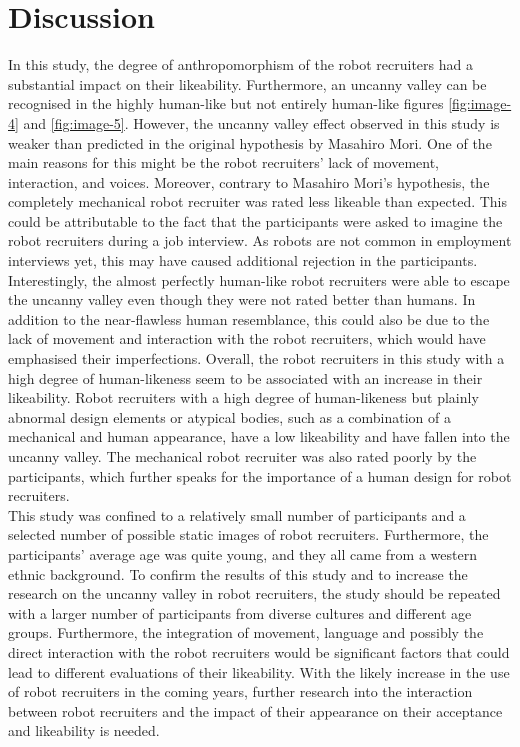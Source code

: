 \section{Discussion}
In this study, the degree of anthropomorphism of the robot recruiters had a substantial impact on their likeability. Furthermore, an uncanny valley can be recognised in the highly human-like but not entirely human-like figures \ref{fig:image-4} and \ref{fig:image-5}. However, the uncanny valley effect observed in this study is weaker than predicted in the original hypothesis by Masahiro Mori. One of the main reasons for this might be the robot recruiters' lack of movement, interaction, and voices. Moreover, contrary to Masahiro Mori's hypothesis, the completely mechanical robot recruiter was rated less likeable than expected. This could be attributable to the fact that the participants were asked to imagine the robot recruiters during a job interview. As robots are not common in employment interviews yet, this may have caused additional rejection in the participants.
Interestingly, the almost perfectly human-like robot recruiters were able to escape the uncanny valley even though they were not rated better than humans. In addition to the near-flawless human resemblance, this could also be due to the lack of movement and interaction with the robot recruiters, which would have emphasised their imperfections. 
Overall, the robot recruiters in this study with a high degree of human-likeness seem to be  associated with an increase in their likeability. Robot recruiters with a high degree of human-likeness but plainly abnormal design elements or atypical bodies, such as a combination of a mechanical and human appearance, have a low likeability and have fallen into the uncanny valley.
The mechanical robot recruiter was also rated poorly by the participants, which further speaks for the importance of a human design for robot recruiters.\\
This study was confined to a relatively small number of participants and a selected number of possible static images of robot recruiters. Furthermore, the participants' average age was quite young, and they all came from a western ethnic background. To confirm the results of this study and to increase the research on the uncanny valley in robot recruiters, the study should be repeated with a larger number of participants from diverse cultures and different age groups.
Furthermore, the integration of movement, language and possibly the direct interaction with the robot recruiters would be significant factors that could lead to different evaluations of their likeability. With the likely increase in the use of robot recruiters in the coming years, further research into the interaction between robot recruiters and the impact of their appearance on their acceptance and likeability is needed. 